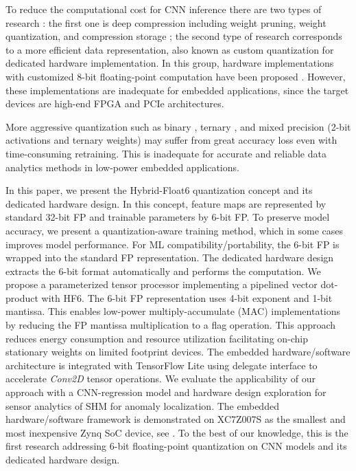 To reduce the computational cost for CNN inference there are two types of research \cite{wu2021low}: the first one is deep compression including weight pruning, weight quantization, and compression storage \cite{han2015deep,han2015learning}; the second type of research corresponds to a more efficient data representation, also known as custom quantization for dedicated hardware implementation. In this group, hardware implementations with customized 8-bit floating-point computation have been proposed \cite{mei2017200mhz, wu2021low, lian2019high}. However, these implementations are inadequate for embedded applications, since the target devices are high-end FPGA and PCIe architectures.

More aggressive quantization such as binary \cite{courbariaux2015binaryconnect}, ternary \cite{lin2015neural}, and mixed precision (2-bit activations and ternary weights) \cite{colangelo2018exploration} may suffer from great accuracy loss even with time-consuming retraining. This is inadequate for accurate and reliable data analytics methods in low-power embedded applications.

In this paper, we present the Hybrid-Float6 quantization concept and its dedicated hardware design. In this concept, feature maps are represented by standard 32-bit FP and trainable parameters by 6-bit FP. To preserve model accuracy, we present a quantization-aware training method, which in some cases improves model performance. For ML compatibility/portability, the 6-bit FP is wrapped into the standard FP representation. The dedicated hardware design extracts the 6-bit format automatically and performs the computation. We propose a parameterized tensor processor implementing a pipelined vector dot-product with HF6. The 6-bit FP representation uses 4-bit exponent and 1-bit mantissa. This enables low-power multiply-accumulate (MAC) implementations by reducing the FP mantissa multiplication to a flag operation. This approach reduces energy consumption and resource utilization facilitating on-chip stationary weights on limited footprint devices. The embedded hardware/software architecture is integrated with TensorFlow Lite using delegate interface to accelerate \emph{Conv2D} tensor operations. We evaluate the applicability of our approach with a CNN-regression model and hardware design exploration for sensor analytics of SHM for anomaly localization. The embedded hardware/software framework is demonstrated on XC7Z007S as the smallest and most inexpensive Zynq SoC device, see . To the best of our knowledge, this is the first research addressing 6-bit floating-point quantization on CNN models and its dedicated hardware design.

